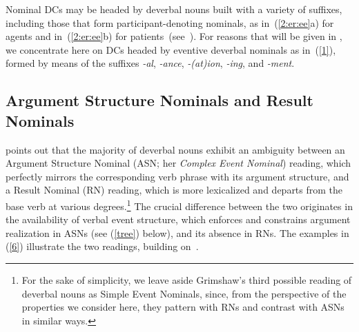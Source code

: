 \documentclass[output=paper]{langsci/langscibook}
\begin{document}
Nominal DCs may be headed by deverbal nouns built with a variety of suffixes,  {including}  those that form participant-denoting nominals, as in~(\ref{2:er:ee}a) for agents and in~(\ref{2:er:ee}b) for patients~(see~\citealt[73]{lieber:16}). For reasons that 
will be given in , we concentrate here on DCs headed by eventive deverbal nominals as in~(\ref{1}), formed by means of the suffixes \textit{-al}, \textit{-ance}, \textit{-(at)ion},  \textit{-ing}, and \textit{-ment}.


\begin{exe}
\end{exe}

\subsection{Argument Structure Nominals and Result Nominals}\label{sec:lit:ASN:RN}

\cite{grimshaw:90} points out that the majority of deverbal nouns exhibit an ambiguity between an  Argument Structure Nominal  (ASN; her {\it Complex Event Nominal}) reading, which perfectly mirrors the corresponding verb phrase with its argument structure,  and  a Result Nominal (RN) reading, which is more lexicalized and departs from the base verb at various degrees.\footnote{For the sake of simplicity, we leave aside Grimshaw's third possible reading of deverbal nouns as Simple Event Nominals, since, from the perspective of the properties we consider here, they pattern with RNs and contrast with ASNs in similar ways.} The crucial difference between the two originates in the availability of verbal event structure,  which enforces and constrains argument realization in ASNs (see (\ref{tree}) below), and its absence in RNs. The examples in (\ref{6}) illustrate the two readings, building on~\citet[49]{grimshaw:90}.

\begin{exe}
\end{exe}
\end{document}
